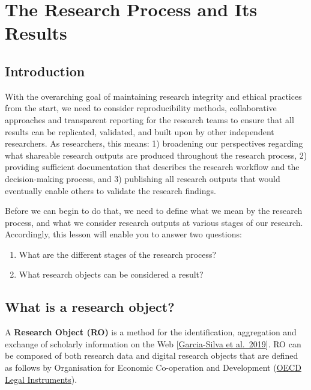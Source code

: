 \documentclass[
  letterpaper,
  DIV=11,
  numbers=noendperiod]{scrreport}
\providecommand{\tightlist}{%
  \setlength{\itemsep}{0pt}\setlength{\parskip}{0pt}}\usepackage{longtable,booktabs,array}
\begin{document}
\hypertarget{the-research-process-and-its-results}{%
\chapter{The Research Process and Its
Results}\label{the-research-process-and-its-results}}

\hypertarget{introduction-15}{%
\section{Introduction}\label{introduction-15}}

With the overarching goal of maintaining research integrity and ethical
practices from the start, we need to consider reproducibility methods,
collaborative approaches and transparent reporting for the research
teams to ensure that all results can be replicated, validated, and built
upon by other independent researchers. As researchers, this means: 1)
broadening our perspectives regarding what shareable research outputs
are produced throughout the research process, 2) providing sufficient
documentation that describes the research workflow and the
decision-making process, and 3) publishing all research outputs that
would eventually enable others to validate the research findings.

Before we can begin to do that, we need to define what we mean by the
research process, and what we consider research outputs at various
stages of our research. Accordingly, this lesson will enable you to
answer two questions:

\begin{enumerate}
\def\labelenumi{\arabic{enumi}.}
\tightlist
\item
  What are the different stages of the research process?
\item
  What research objects can be considered a result?
\end{enumerate}

\hypertarget{what-is-a-research-object}{%
\section{What is a research object?}\label{what-is-a-research-object}}

A \textbf{Research Object (RO)} is a method for the identification,
aggregation and exchange of scholarly information on the Web
{[}\href{https://www.sciencedirect.com/science/article/abs/pii/S0167739X18314638}{Garcia-Silva
et al.~2019}{]}. RO can be composed of both research data and digital
research objects that are defined as follows by Organisation for
Economic Co-operation and Development
(\href{https://legalinstruments.oecd.org/en/instruments/OECD-LEGAL-0347}{OECD
Legal Instruments}).
\end{document}
